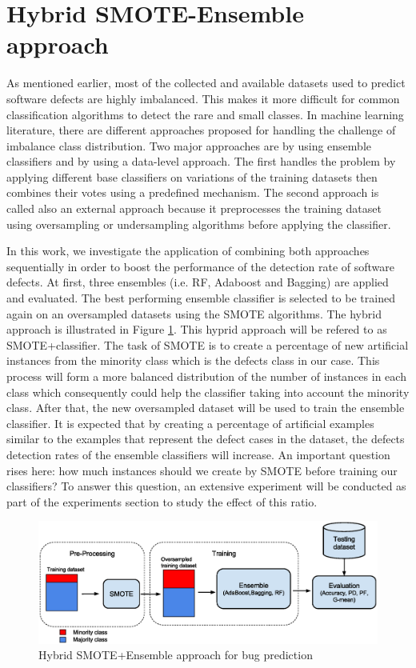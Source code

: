 \documentclass[runningheads,a4paper]{llncs}
\begin{document}
\section{Hybrid SMOTE-Ensemble approach}
\label{SMOTE-Ensemble}

As mentioned earlier, most of the collected and available datasets used to predict software defects are highly imbalanced. This makes it more difficult for common classification algorithms to detect the rare and small classes. In machine learning literature, there are different approaches proposed for handling the challenge of imbalance class distribution. Two major approaches are by using ensemble classifiers and by using a data-level approach. The first handles the problem by applying different base classifiers on variations of the training datasets then combines their votes using a predefined mechanism. The second approach is called also an external approach because it preprocesses the training dataset using oversampling or undersampling algorithms before applying the classifier. 

In this work, we investigate the application of combining both approaches sequentially in order to boost the performance of the detection rate of software defects. At first, three ensembles (i.e. RF, Adaboost and Bagging) are applied and evaluated. The best performing ensemble classifier is selected to be trained again on an oversampled datasets using the SMOTE algorithms. The hybrid approach is illustrated in Figure \ref{fig:fig1}. This hyprid approach will be refered to as SMOTE+classifier. The task of SMOTE is to create a percentage of new artificial instances from the minority class which is the defects class in our case. This process will form a more balanced distribution of the number of instances in each class which consequently could help the classifier taking into account the minority class. After that, the new oversampled dataset will be used to train the ensemble classifier. It is expected that by creating a percentage of artificial examples similar to the examples that represent the defect cases in the dataset, the defects detection rates of the ensemble classifiers will increase. An important question rises here: how much instances should we create by SMOTE before training our classifiers? To answer this question, an extensive experiment will be conducted as part of the experiments section to study the effect of this ratio.
 

\begin{figure}[H]
\centering
\includegraphics[scale=0.50]{Framework.eps}
\caption{Hybrid SMOTE+Ensemble approach for bug prediction}
\label{fig:fig1}
\end{figure}
\end{document}

